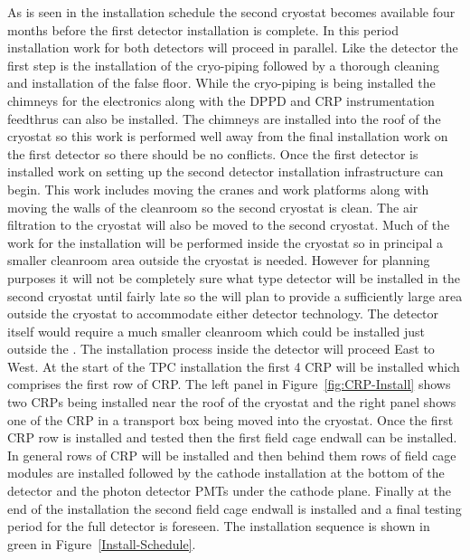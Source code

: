 As is seen in the installation schedule the second cryostat becomes
available four months before the first detector installation is
complete. In this period installation work for both detectors will
proceed in parallel. Like the  detector the first step is
the installation of the cryo-piping followed by a thorough cleaning
and installation of the false floor. While the cryo-piping is being
installed the  chimneys for the electronics along with the
DPPD and CRP instrumentation feedthrus can also be installed. The
chimneys are installed into the roof of the cryostat so this work is
performed well away from the final installation work on the first
detector so there should be no conflicts. Once the first detector is
installed work on setting up the second detector installation
infrastructure can begin. This work includes moving the cranes and
work platforms along with moving the walls of the cleanroom so the
second cryostat is clean. The air filtration to the cryostat will also
be moved to the second cryostat.  Much of the work for the 
installation will be performed inside the cryostat so in principal a
smaller cleanroom area outside the cryostat is needed. However for
planning purposes it will not be completely sure what type detector
will be installed in the second cryostat until fairly late so the 
will plan to provide a sufficiently large area outside the cryostat to
accommodate either detector technology.  The detector itself
would require a much smaller cleanroom which could be installed just
outside the . The installation process inside the detector will
proceed East to West. At the start of the TPC installation the first
\num{4} CRP will be installed which comprises the first row of
CRP. The left panel in Figure~\ref{fig:CRP-Install} shows two CRPs
being installed near the roof of the cryostat and the right panel
shows one of the CRP in a transport box being moved into the cryostat.
Once the first CRP row is installed and tested then the first field
cage endwall can be installed. In general rows of CRP will be
installed and then behind them rows of field cage modules are
installed followed by the cathode installation at the bottom of the
detector and the photon detector PMTs under the cathode plane. Finally
at the end of the installation the second field cage endwall is
installed and a final testing period for the full detector is
foreseen. The  installation sequence is shown in green in
Figure~\ref{Install-Schedule}.
